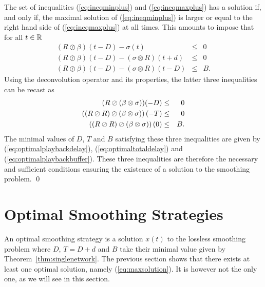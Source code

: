 \pr The set of inequalities (\ref{eq:ineqminplus}) and (\ref{eq:ineqmaxplus}) has a solution if, and only if,
the maximal solution of (\ref{eq:ineqminplus}) is larger or equal to the right hand side of (\ref{eq:ineqmaxplus}) at all
times. This amounts to impose that for all $t \in \mathbb{R}$
\begin{eqnarray*}
 (R \oslash \beta)(t-D) - \sigma(t) & \leq & 0 \\
 (R \oslash \beta)(t-D) -  (\sigma \otimes R)(t+d) & \leq &  0 \\
(R \oslash \beta)(t-D) - (\sigma \otimes R)(t-D) & \leq & B.
\end{eqnarray*}
Using the deconvolution operator and its properties, the latter three inequalities can be recast as
\begin{eqnarray*}
\mylabel{eq:constraint1}
 (R \oslash (\beta \otimes \sigma)) (-D) & \leq & 0 \\
\mylabel{eq:constraint3}
\left( (R \oslash R) \oslash (\beta \otimes \sigma) \right)(-T) & \leq &  0 \\
\mylabel{eq:constraint5}
\left( (R \oslash R) \oslash (\beta \otimes \sigma) \right)(0) & \leq & B.
\end{eqnarray*}
The minimal values of $D$, $T$ and $B$ satisfying these three inequalities are given by
(\ref{eq:optimalplaybackdelay}), (\ref{eq:optimaltotaldelay}) and (\ref{eq:optimalplaybackbuffer}).
These three inequalities are therefore the necessary and sufficient conditions ensuring the existence
of a solution to the smoothing problem.
\qed

\section{Optimal Smoothing Strategies}

An optimal smoothing strategy is a solution $x(t)$ to the lossless smoothing problem where $D$, $T=D+d$ and $B$ take their minimal value given by Theorem~\ref{thm:singlenetwork}. The previous section shows that there exists at least one optimal solution, namely (\ref{eq:maxsolution}). It is however not the only one, as we will see in this section.


